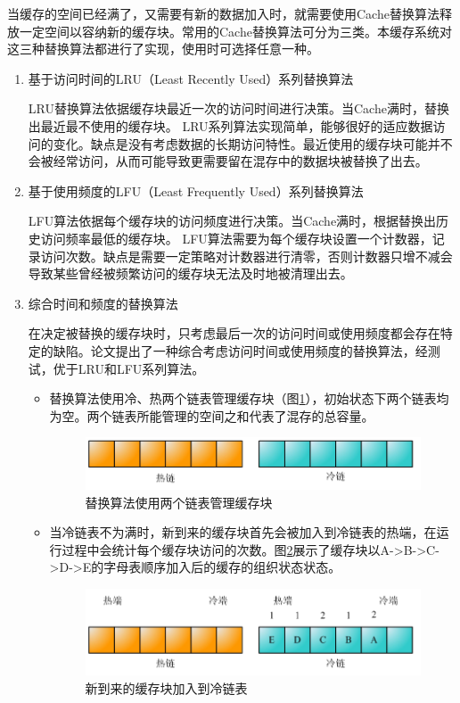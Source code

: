 当缓存的空间已经满了，又需要有新的数据加入时，就需要使用Cache替换算法释放一定空间以容纳新的缓存块。常用的Cache替换算法可分为三类。本缓存系统对这三种替换算法都进行了实现，使用时可选择任意一种。
\begin{enumerate}

\item 基于访问时间的LRU（Least Recently Used）系列替换算法

LRU替换算法依据缓存块最近一次的访问时间进行决策。当Cache满时，替换出最近最不使用的缓存块。
LRU系列算法实现简单，能够很好的适应数据访问的变化。缺点是没有考虑数据的长期访问特性。最近使用的缓存块可能并不会被经常访问，从而可能导致更需要留在混存中的数据块被替换了出去。

\item 基于使用频度的LFU（Least Frequently Used）系列替换算法

LFU算法依据每个缓存块的访问频度进行决策。当Cache满时，根据替换出历史访问频率最低的缓存块。
LFU算法需要为每个缓存块设置一个计数器，记录访问次数。缺点是需要一定策略对计数器进行清零，否则计数器只增不减会导致某些曾经被频繁访问的缓存块无法及时地被清理出去。

\item 综合时间和频度的替换算法

在决定被替换的缓存块时，只考虑最后一次的访问时间或使用频度都会存在特定的缺陷。论文提出了一种综合考虑访问时间或使用频度的替换算法，经测试，优于LRU和LFU系列算法。
\begin{itemize}
\item
替换算法使用冷、热两个链表管理缓存块（图\ref{fig:replace-algo-1}），初始状态下两个链表均为空。两个链表所能管理的空间之和代表了混存的总容量。
\begin{figure}[htb]
\centering
\includegraphics[width=0.6\linewidth]{./graph/replace-algo-1}
\caption{替换算法使用两个链表管理缓存块}
\label{fig:replace-algo-1}
\end{figure}

\item
当冷链表不为满时，新到来的缓存块首先会被加入到冷链表的热端，在运行过程中会统计每个缓存块访问的次数。图\ref{fig:replace-algo-2}展示了缓存块以A->B->C->D->E的字母表顺序加入后的缓存的组织状态状态。
\begin{figure}[htb]
\centering
\includegraphics[width=0.6\linewidth]{./graph/replace-algo-2}
\caption{新到来的缓存块加入到冷链表}
\label{fig:replace-algo-2}
\end{figure}


\end{itemize}
\end{enumerate}

